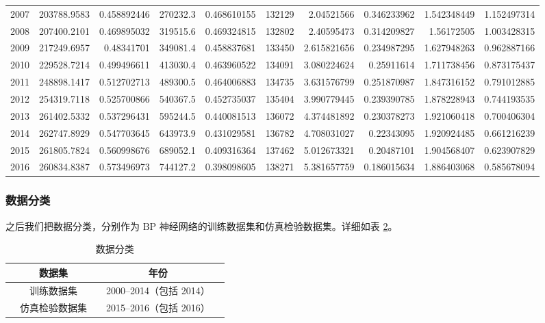 \begin{table}[hb]
{\begin{tabular}{rrrrrrrrrr}
        2007 & 203788.9583 & 0.458892446 & 270232.3 & 0.468610155 & 132129 & 2.04521566 & 0.346233962 & 1.542348449 & 1.152497314 \\
        2008 & 207400.2101 & 0.469895032 & 319515.6 & 0.469324815 & 132802 & 2.40595473 & 0.314209827 & 1.56172505 & 1.003428315 \\
        2009 & 217249.6957 & 0.48341701 & 349081.4 & 0.458837681 & 133450 & 2.615821656 & 0.234987295 & 1.627948263 & 0.962887166 \\
        2010 & 229528.7214 & 0.499496611 & 413030.4 & 0.463960522 & 134091 & 3.080224624 & 0.25911614 & 1.711738456 & 0.873175437 \\
        2011 & 248898.1417 & 0.512702713 & 489300.5 & 0.464006883 & 134735 & 3.631576799 & 0.251870987 & 1.847316152 & 0.791012885 \\
        2012 & 254319.7118 & 0.525700866 & 540367.5 & 0.452735037 & 135404 & 3.990779445 & 0.239390785 & 1.878228943 & 0.744193535 \\
        2013 & 261402.5332 & 0.537296431 & 595244.5 & 0.440081513 & 136072 & 4.374481892 & 0.230378273 & 1.921060418 & 0.700406304 \\
        2014 & 262747.8929 & 0.547703645 & 643973.9 & 0.431029581 & 136782 & 4.708031027 & 0.22343095 & 1.920924485 & 0.661216239 \\
        2015 & 261805.7824 & 0.560998676 & 689052.1 & 0.409316364 & 137462 & 5.012673321 & 0.20487101 & 1.904568407 & 0.623907829 \\
        2016 & 260834.8387 & 0.573496973 & 744127.2 & 0.398098605 & 138271 & 5.381657759 & 0.186015634 & 1.886403068 & 0.585678094 \\
        \bottomrule[1.5pt]
        \end{tabular}}%
      \label{tab:jutizhi}%
    \end{table}%

  \subsubsection{数据分类}

    之后我们把数据分类，分别作为 $\mathrm{BP}$ 神经网络的训练数据集和仿真检验数据集。详细如表 \ref{tab:shujufenlei}。

    \begin{table}[thb]
      \centering
      \caption{数据分类}
      \begin{tabular*}{0.618\paperwidth}{@{\extracolsep{\fill}}ccccc}
        \toprule[1.5pt]
        &数据集 && 年份 &\\
        \midrule[1pt]
        &训练数据集 && 2000--2014（包括 2014） &\\
        &仿真检验数据集 && 2015--2016（包括 2016） &\\
        \bottomrule[1.5pt]
      \end{tabular*}
      \label{tab:shujufenlei}
    \end{table}
    \clearpage

